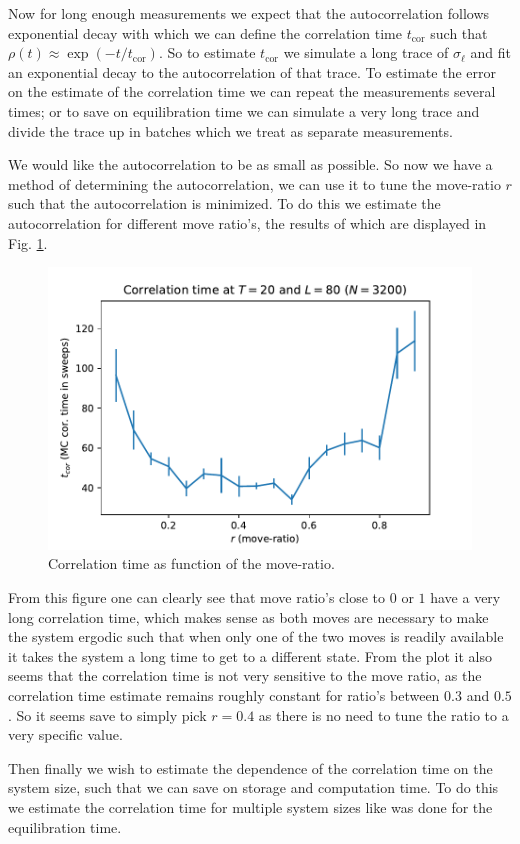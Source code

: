 Now for long enough measurements we expect that the autocorrelation follows exponential decay with which we can define the correlation time $t_\text{cor}$ such that $\rho(t) \approx \exp(- t / t_\text{cor})$.
So to estimate $t_\text{cor}$ we simulate a long trace of $\sigma_\ell$ and fit an exponential decay to the autocorrelation of that trace.
To estimate the error on the estimate of the correlation time we can repeat the measurements several times; or to save on equilibration time we can simulate a very long trace and divide the trace up in batches which we treat as separate measurements.

We would like the autocorrelation to be as small as possible.
So now we have a method of determining the autocorrelation, we can use it to tune the move-ratio $r$ such that the autocorrelation is minimized.
To do this we estimate the autocorrelation for different move ratio's, the results of which are displayed in Fig. \ref{fig:tcor_rdep}.
\begin{figure}[ht]
    \centering
    \includegraphics[width=0.7\linewidth]{img/tcor_r_t20_l80.pdf}
    \caption{Correlation time as function of the move-ratio.}
    \label{fig:tcor_rdep}
\end{figure}
From this figure one can clearly see that move ratio's close to $0$ or $1$ have a very long correlation time, which makes sense as both moves are necessary to make the system ergodic such that when only one of the two moves is readily available it takes the system a long time to get to a different state.
From the plot it also seems that the correlation time is not very sensitive to the move ratio, as the correlation time estimate remains roughly constant for ratio's between $0.3$ and $0.5$.
So it seems save to simply pick $r = 0.4$ as there is no need to tune the ratio to a very specific value.

Then finally we wish to estimate the dependence of the correlation time on the system size, such that we can save on storage and computation time.
To do this we estimate the correlation time for multiple system sizes like was done for the equilibration time.


